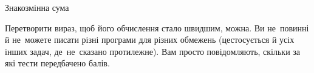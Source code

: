\begin{problemAllDefault}{Знакозмінна сума}

\Notes
Перетворити вираз, щоб \mbox{його} обчислення стало швидшим, можна.
%
Ви не~повинні й не~можете писати різні програми для різних обмежень (це\nolinebreak[3] стосується й усіх інших задач, де~не~сказано протилежне). 
Вам просто повідомляють, скільки за які тести передбачено балів.



\end{problemAllDefault}


